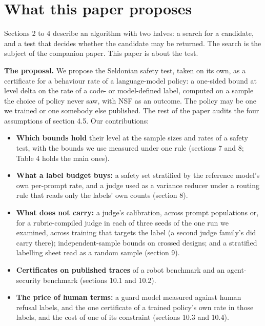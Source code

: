 \documentclass[11pt]{article}
\begin{document}
\section{What this paper proposes}

Sections 2 to 4 describe an algorithm with two halves: a search for a candidate, and a test that decides whether the candidate may be returned. The search is the subject of the companion paper. This paper is about the test.


\textbf{The proposal.} We propose the Seldonian safety test, taken on its own, as a certificate for a behaviour rate of a language-model policy: a one-sided bound at level delta on the rate of a code- or model-defined label, computed on a sample the choice of policy never saw, with NSF as an outcome. The policy may be one we trained or one somebody else published. The rest of the paper audits the four assumptions of section 4.5. Our contributions:


\begin{itemize}
\item \textbf{Which bounds hold} their level at the sample sizes and rates of a safety test, with the bounds we use measured under one rule (sections 7 and 8; Table 4 holds the main ones).
\item \textbf{What a label budget buys:} a safety set stratified by the reference model's own per-prompt rate, and a judge used as a variance reducer under a routing rule that reads only the labels' own counts (section 8).
\item \textbf{What does not carry:} a judge's calibration, across prompt populations or, for a rubric-compiled judge in each of three seeds of the one run we examined, across training that targets the label (a second judge family's did carry there); independent-sample bounds on crossed designs; and a stratified labelling sheet read as a random sample (section 9).
\item \textbf{Certificates on published traces} of a robot benchmark and an agent-security benchmark (sections 10.1 and 10.2).
\item \textbf{The price of human terms:} a guard model measured against human refusal labels, and the one certificate of a trained policy's own rate in those labels, and the cost of one of its constraint (sections 10.3 and 10.4).
\end{itemize}
\end{document}
